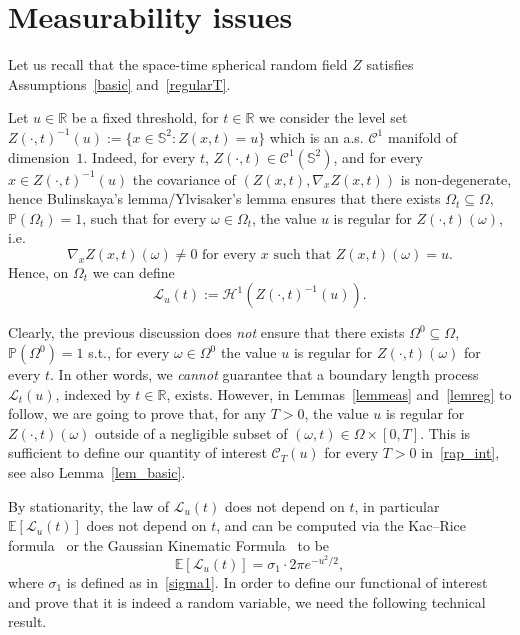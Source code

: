 \documentclass[AHL,Unicode,longabstracts,published]{cedram}
\newcommand{\clC}{\mathcal{C}}
\newcommand{\clL}{\mathcal{L}}
\newcommand{\clH}{\mathcal{H}}
\newcommand{\bbS}{\mathbb{S}}
\newcommand{\bbR}{\mathbb{R}}
\newcommand{\bbP}{\mathbb{P}}
\newcommand{\bbE}{\mathbb{E}}
\begin{document}
\section{Measurability issues}

Let us recall that the space-time spherical random field $Z$ satisfies Assumptions~\ref{basic} and~\ref{regularT}.

Let $u\in \bbR$ be a fixed threshold, for $ t\in \bbR$ we consider the level set $Z(\cdot, t)^{-1}(u):=\{ x\in \bbS^2 : Z(x,t) = u\}$ which is an a.s. $\clC^1$ manifold of dimension~$1$. Indeed, for every $t$, $Z(\cdot, t)\in \clC^1(\bbS^2)$, and for every $x\in Z(\cdot, t)^{-1}(u)$ the covariance of $(Z(x,t), \nabla_x Z(x,t))$ is non-degenerate, hence Bulinskaya's lemma/Ylvisaker's lemma ensures that there exists $
\Omega_t\subseteq \Omega$, $\bbP(\Omega_t)=1$, such that for every $
\omega\in \Omega_t$, the value $u$ is regular for $Z(\cdot, t)(\omega)$, i.e.
\begin{equation*}
\nabla_x Z(x, t)(\omega)\ne 0 \text{ for every } x \text{ such that } Z(x,t)(\omega)=u.
\end{equation*}
Hence, on $\Omega_t$ we can define
\begin{equation*}
\clL_u(t):=\clH^1\left(Z(\cdot, t)^{-1}(u)\right).
\end{equation*}
\begin{rema}
Clearly, the previous discussion does \emph{not} ensure that there exists $\Omega^0\subseteq \Omega$, $\bbP(\Omega^0)=1$ s.t., for every $\omega\in \Omega^0$ the value $u$ is regular for $Z(\cdot, t)(\omega)$ for every $t$. In other words, we \emph{cannot} guarantee that a boundary length process $\clL_t(u)$, indexed by $t\in \bbR$, exists. However, in Lemmas~\ref{lemmeas} and~\ref{lemreg} to follow, we are going to prove that, for any $T>0$, the value $u$ is regular for $Z(\cdot, t)(\omega)$ outside of a negligible subset of $(\omega, t)\in \Omega\times [0,T]$. This is sufficient to define our quantity of interest $\clC_T(u)$ for every $T>0$ in~\eqref{rap_int}, see also Lemma~\ref{lem_basic}.
\end{rema}

By stationarity, the law of $\clL_u(t)$ does not depend on $t$, in particular $\bbE[\clL_u(t)]$ does not depend on $t$, and can be computed via the Kac--Rice formula~\cite[Theorem~6.8]{AW:09} or the Gaussian Kinematic Formula~\cite[Theorem~13.2.1]{adlertaylor} to be
\begin{equation*}
\bbE[\clL_u(t)] = \sigma_1 \cdot 2\pi e^{-u^2/2},
\end{equation*}
where $\sigma_1$ is defined as in~\eqref{sigma1}. In order to define our functional of interest and prove that it is indeed a random variable, we need the following technical result.
\end{document}
